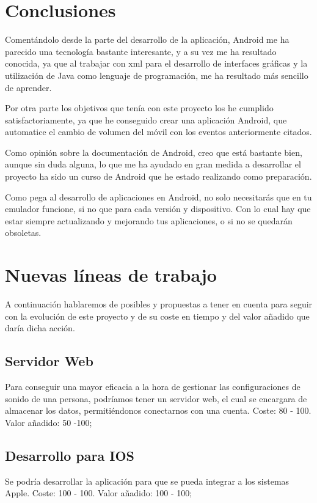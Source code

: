 
\section{Conclusiones}
Comentándolo desde la parte del desarrollo de la aplicación, Android me ha parecido una tecnología bastante interesante, y a su vez me ha resultado conocida, ya que al trabajar con xml para el desarrollo de interfaces gráficas y la utilización de Java como lenguaje de programación, me ha resultado más sencillo de aprender.

Por otra parte los objetivos que tenía con este proyecto los he cumplido satisfactoriamente, ya que he conseguido crear una aplicación Android, que automatice el cambio de volumen del móvil con los eventos anteriormente citados.

Como opinión sobre la documentación de Android, creo que está bastante bien, aunque sin duda alguna, lo que me ha ayudado en gran medida a desarrollar el proyecto ha sido un curso de Android que he estado realizando como preparación.

Como pega al desarrollo de aplicaciones en Android, no solo necesitarás que en tu emulador funcione, si no que para cada versión y dispositivo. Con lo cual hay que estar siempre actualizando y mejorando tus aplicaciones, o si no se quedarán obsoletas.

\section{Nuevas líneas de trabajo}
A continuación hablaremos de posibles y propuestas a tener en cuenta para seguir con la evolución de este proyecto y de su coste en tiempo y del valor añadido que daría dicha acción.

\subsection{Servidor Web}
Para conseguir una mayor eficacia a la hora de gestionar las configuraciones de sonido de una persona, podríamos tener un servidor web, el cual se encargara de almacenar los datos, permitiéndonos conectarnos con una cuenta.
Coste: 80 - 100.
Valor añadido: 50 -100;

\subsection{Desarrollo para IOS}
Se podría desarrollar la aplicación para que se pueda integrar a los sistemas Apple.
Coste: 100 - 100.
Valor añadido: 100 - 100;

